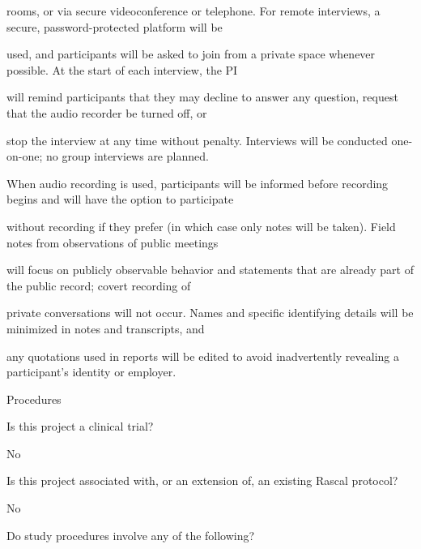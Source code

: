 \documentclass[10pt, letterpaper]{article}
\begin{document}
rooms, or via secure videoconference or telephone. For remote interviews, a secure, password-protected platform will be

used, and participants will be asked to join from a private space whenever possible. At the start of each interview, the PI

will remind participants that they may decline to answer any question, request that the audio recorder be turned off, or

stop the interview at any time without penalty. Interviews will be conducted one-on-one; no group interviews are planned.

\vspace{0.5em}

\vspace{0.5em}

When audio recording is used, participants will be informed before recording begins and will have the option to participate

without recording if they prefer (in which case only notes will be taken). Field notes from observations of public meetings

will focus on publicly observable behavior and statements that are already part of the public record; covert recording of

private conversations will not occur. Names and specific identifying details will be minimized in notes and transcripts, and

any quotations used in reports will be edited to avoid inadvertently revealing a participant’s identity or employer.

\vspace{0.5em}

\vspace{0.5em}

\vspace{0.5em}

\begin{responsebox}

Procedures

\vspace{0.5em}

\end{responsebox}

Is this project a clinical trial?

No

Is this project associated with, or an extension of, an existing Rascal protocol?

No

Do study procedures involve any of the following?
\end{document}
